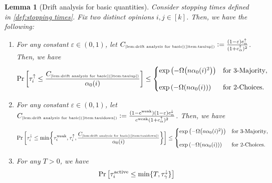 \documentclass[letterpaper,11pt]{article}
\newtheorem{lemma}[theorem]{Lemma}
\def\defeq{\mathrel{\mathop:}=}
\DeclarePairedDelimiter{\cbra}{\lbrace}{\rbrace} %
\newcommand{\constrefs}[2]{C_{\mbox{\tiny\ref{#1}(\ref{#2})}}}
\newcommand{\alphanorm}{\gamma}
\newcommand{\cweak}{c^{\mathrm{weak}}}
\newcommand{\calphadown}{c^{\downarrow}_\alpha}
\newcommand{\taunormdown}{\tau^{\downarrow}_\alphanorm}
\newcommand{\cnormdown}{c^{\downarrow}_\alphanorm}
\newcommand{\tauiup}{\tau^{\uparrow}_i}
\newcommand{\ciup}{c_\alpha^{\uparrow}}
\newcommand{\tauidown}{\tau^{\downarrow}_i}
\newcommand{\tauiweak}{\tau^{\mathrm{weak}}_i}
\newcommand{\cactive}{c^{\mathrm{active}}}
\newcommand{\tauiactive}{\tau^{\mathrm{active}}_i}
\begin{document}


\begin{lemma}[Drift analysis for basic quantities]
  \label{lem:drift analysis for basic}
  Consider stopping times defined in \cref{def:stopping times}.
  Fix two distinct opinions $i,j\in [k]$.
  Then, we have the following:
  \begin{enumerate}
    \renewcommand{\labelenumi}{(\roman{enumi})}
\item \label{item:tauiup}
For any constant $\varepsilon\in (0,1)$, 
let $\constrefs{lem:drift analysis for basic}{item:tauiup}\defeq \frac{ (1 - \varepsilon) \ciup }{(1+\ciup)^2}$.
Then, we have
\begin{align*}
\Pr\qty[ \tauiup \le \frac{\constrefs{lem:drift analysis for basic}{item:tauiup}}{ \alpha_0(i)} ] \le 
    \begin{cases}
        \exp\qty(-\Omega\qty( n\alpha_0(i)^2 ))	& \text{for 3-Majority},\\[10pt]
        \exp\qty( -\Omega\qty( n\alpha_0(i) ) ) & \text{for 2-Choices}.
    \end{cases}
\end{align*}
\item \label{item:tauidown}
For any constant $\varepsilon \in (0,1)$, let
$\constrefs{lem:drift analysis for basic}{item:tauidown}\defeq \frac{(1-\cweak)(1-\varepsilon)\calphadown}{\cweak (1+\ciup)^2}$.
Then, we have
\begin{align*}
    \Pr\qty[ \tauidown \le \min\cbra*{\tauiweak,\tauiup,\frac{\constrefs{lem:drift analysis for basic}{item:tauidown}}{\alpha_0(i)}} ] \le 
    \begin{cases}
            \exp\qty(-\Omega\qty( n\alpha_0(i)^2 ))	& \text{for 3-Majority},\\[10pt]
            \exp\qty( -\Omega\qty( n\alpha_0(i) ) ) & \text{for 2-Choices}.
    \end{cases}
\end{align*}
\item \label{item:tauiactive}
For any $T>0$, we have
\begin{align*}
    \Pr\qty[\tauiactive\leq \min\{T,\taunormdown\}]

\end{align*}
\end{enumerate}
\end{lemma}
\end{document}
